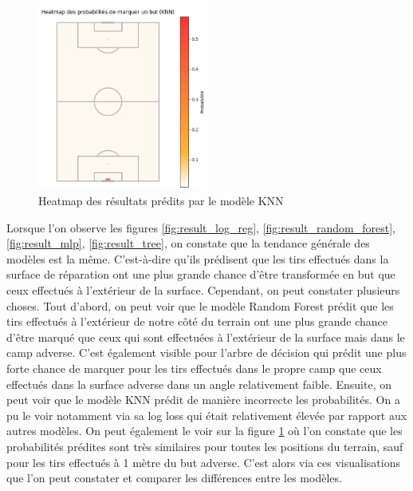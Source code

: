 \documentclass[12pt]{article}
\begin{document}
\begin{figure}[htp]
    \centering
    \includegraphics[width=0.5\textwidth]{img/pitch_visualisation_knn.png}
    \caption{Heatmap des résultats prédits par le modèle KNN}
    \label{fig:result_knn}
\end{figure}
\newpage
Lorsque l'on observe les figures \ref{fig:result_log_reg}, \ref{fig:result_random_forest}, \ref{fig:result_mlp}, \ref{fig:result_tree}, on constate que la tendance générale des modèles est la même.
C'est-à-dire qu'ils prédisent que les tirs effectués dans la surface de réparation ont une plus grande chance d'être transformée en but que ceux effectués à l'extérieur de la surface.
Cependant, on peut constater plusieurs choses.
Tout d'abord, on peut voir que le modèle Random Forest prédit que les tirs effectués à l'extérieur de notre côté du terrain ont une plus grande chance d'être marqué que ceux qui sont effectuées à l'extérieur de la surface mais dans le camp adverse.
C'est également visible pour l'arbre de décision qui prédit une plus forte chance de marquer pour les tirs effectués dans le propre camp que ceux effectués dans la surface adverse dans un angle relativement faible.
\newline\newline
Ensuite, on peut voir que le modèle KNN prédit de manière incorrecte les probabilités.
On a pu le voir notamment via sa log loss qui était relativement élevée par rapport aux autres modèles.
On peut également le voir sur la figure \ref{fig:result_knn} où l'on constate que les probabilités prédites sont très similaires pour toutes les positions du terrain, sauf pour les tirs effectués à 1 mètre du but adverse.
\newline\newline
C'est alors via ces visualisations que l'on peut constater et comparer les différences entre les modèles.
\end{document}
